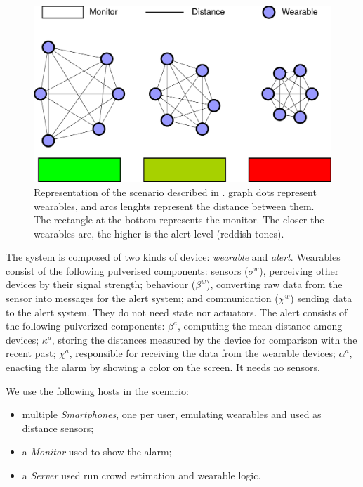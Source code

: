 \documentclass[conference]{IEEEtran}
\newcommand{\meta}[1]{{\color{blue}#1}}
\begin{document}
\begin{figure}
    \centering
    \includegraphics[width=.9\columnwidth]{figures/crow-laboratory-demo.drawio.pdf}
    \caption{
        Representation of the scenario described in .
        graph dots represent wearables,
        and arcs lenghts represent the distance between them.
        The rectangle at the bottom represents the monitor.
        The closer the wearables are, the higher is the alert level
        (reddish tones).
    }
    \label{fig:crowd-alert}
\end{figure}

The system is composed of two kinds of device: \emph{wearable} and \emph{alert}.
%
Wearables consist of the following pulverised components:
sensors ($\sigma^w$), perceiving other devices by their signal strength;
behaviour ($\beta^w$), converting raw data from the sensor into messages for the alert system; and
communication ($\chi^w$) sending data to the alert system.
%
They do not need state nor actuators.
%
The alert consists of the following pulverized components:
$\beta^a$, computing the mean distance among devices;
$\kappa^a$, storing the distances measured by the device for comparison with the recent past;
$\chi^a$, responsible for receiving the data from the wearable devices;
$\alpha^a$, enacting the alarm by showing a color on the screen.
%
It needs no sensors.

We use the following hosts in the scenario:
\begin{itemize}
    \item multiple \emph{Smartphones}, one per user, emulating wearables and used as distance sensors;
    \item a \emph{Monitor} used to show the alarm;
    \item a \emph{Server} used run crowd estimation and wearable logic.
\end{itemize}
\end{document}
